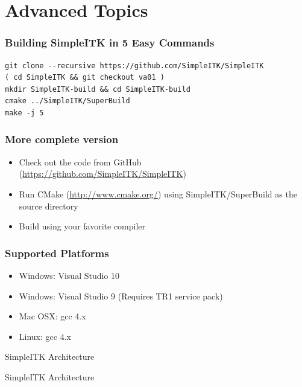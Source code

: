 \section{Advanced Topics}

\begin{frame}[fragile]
\frametitle{Building SimpleITK in 5 Easy Commands}
\small
\begin{verbatim}
git clone --recursive https://github.com/SimpleITK/SimpleITK
( cd SimpleITK && git checkout va01 )
mkdir SimpleITK-build && cd SimpleITK-build
cmake ../SimpleITK/SuperBuild
make -j 5
\end{verbatim}
\normalsize
\end{frame}

\begin{frame}[fragile]
\frametitle{More complete version}
\begin{itemize}
  \item Check out the code from GitHub (\url{https://github.com/SimpleITK/SimpleITK})
  \item Run CMake (\url{http://www.cmake.org/}) using SimpleITK/SuperBuild as the source directory
  \item Build using your favorite compiler
\end{itemize}
\end{frame}

\begin{frame}[fragile]
\frametitle{Supported Platforms}
\begin{itemize}
  \item Windows: Visual Studio 10
  \item Windows: Visual Studio 9 (Requires TR1 service pack)
  \item Mac OSX: gcc 4.x
  \item Linux: gcc 4.x
\end{itemize}
\end{frame}

\begin{frame}{SimpleITK Architecture}
\fontsize{36pt}{36pt}\selectfont
\center
\begin{center}
SimpleITK Architecture
\end{center}
\end{frame}

